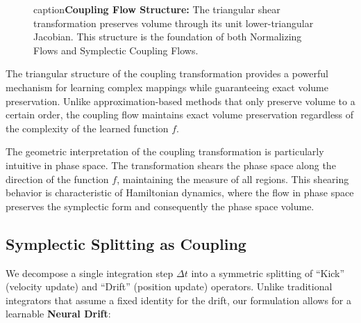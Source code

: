\documentclass[12pt,a4paper]{article}
\begin{document}
\begin{figure}[htbp]
caption{\textbf{Coupling Flow Structure:} The triangular shear transformation 
         preserves volume through its unit lower-triangular Jacobian. This 
         structure is the foundation of both Normalizing Flows and 
         Symplectic Coupling Flows.}
\label{fig:coupling_flow}
\end{figure}

The triangular structure of the coupling transformation provides a powerful mechanism for learning complex mappings while guaranteeing exact volume preservation. Unlike approximation-based methods that only preserve volume to a certain order, the coupling flow maintains exact volume preservation regardless of the complexity of the learned function $f$.

The geometric interpretation of the coupling transformation is particularly intuitive in phase space. The transformation shears the phase space along the direction of the function $f$, maintaining the measure of all regions. This shearing behavior is characteristic of Hamiltonian dynamics, where the flow in phase space preserves the symplectic form and consequently the phase space volume.

\subsection{Symplectic Splitting as Coupling}

We decompose a single integration step $\Delta t$ into a symmetric splitting of ``Kick'' (velocity update) and ``Drift'' (position update) operators. Unlike traditional integrators that assume a fixed identity for the drift, our formulation allows for a learnable \textbf{Neural Drift}:
\end{document}
